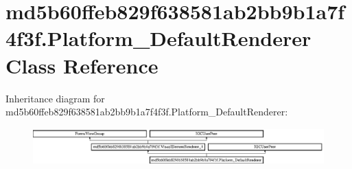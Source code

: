 \hypertarget{classmd5b60ffeb829f638581ab2bb9b1a7f4f3f_1_1Platform__DefaultRenderer}{}\section{md5b60ffeb829f638581ab2bb9b1a7f4f3f.\+Platform\+\_\+\+Default\+Renderer Class Reference}
\label{classmd5b60ffeb829f638581ab2bb9b1a7f4f3f_1_1Platform__DefaultRenderer}
Inheritance diagram for md5b60ffeb829f638581ab2bb9b1a7f4f3f.\+Platform\+\_\+\+Default\+Renderer\+:\begin{figure}[H]
\begin{center}
\leavevmode
\includegraphics[height=1.403509cm]{classmd5b60ffeb829f638581ab2bb9b1a7f4f3f_1_1Platform__DefaultRenderer}
\end{center}
\end{figure}

